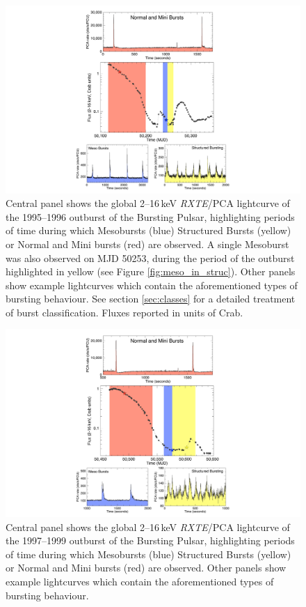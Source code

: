 \begin{figure}
  \centering
  \includegraphics[width=.9\linewidth, trim={9.5cm 0cm 10cm 0cm},clip]{images/obevo1.pdf}
  \caption{\small Central panel shows the global 2--16\,keV \textit{RXTE}/PCA lightcurve of the 1995--1996 outburst of the Bursting Pulsar, highlighting periods of time during which Mesobursts (blue) Structured Bursts (yellow) or Normal and Mini bursts (red) are observed.  A single Mesoburst was also observed on MJD 50253, during the period of the outburst highlighted in yellow (see Figure \ref{fig:meso_in_struc}).  Other panels show example lightcurves which contain the aforementioned types of bursting behaviour.  See section \ref{sec:classes} for a detailed treatment of burst classification.  Fluxes reported in units of Crab.}
  \label{fig:ob_evo1}
\end{figure}

\begin{figure}
  \centering
  \includegraphics[width=.9\linewidth, trim={9.5cm 0cm 10cm 0cm},clip]{images/obevo2.pdf}
  \caption{\small Central panel shows the global 2--16\,keV \textit{RXTE}/PCA lightcurve of the 1997--1999 outburst of the Bursting Pulsar, highlighting periods of time during which Mesobursts (blue) Structured Bursts (yellow) or Normal and Mini bursts (red) are observed.  Other panels show example lightcurves which contain the aforementioned types of bursting behaviour.}
  \label{fig:ob_evo2}
\end{figure}

